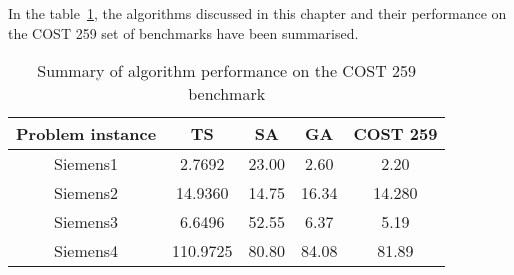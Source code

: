 In the table~\ref{tab:summary1}, the algorithms discussed in this chapter and their performance on the COST 259 set of benchmarks have been summarised.
\begin{table}[H]
\label{tbl:summaryMetaTable}
\begin{center}
	\begin{tabular}{| c | c | c | c | c |}
	\hline
	Problem instance & TS & SA & GA & COST 259 \\ \hline
	Siemens1 & 2.7692 & 23.00 & 2.60 & 2.20 \\ \hline
	Siemens2 & 14.9360 & 14.75 & 16.34 & 14.280 \\ \hline
	Siemens3 & 6.6496 & 52.55 & 6.37 & 5.19 \\ \hline
	Siemens4 & 110.9725 & 80.80 & 84.08 & 81.89 \\ \hline
	\end{tabular}
\caption{Summary of algorithm performance on the COST 259 benchmark}
\label{tab:summary1}
\end{center}
\end{table}
